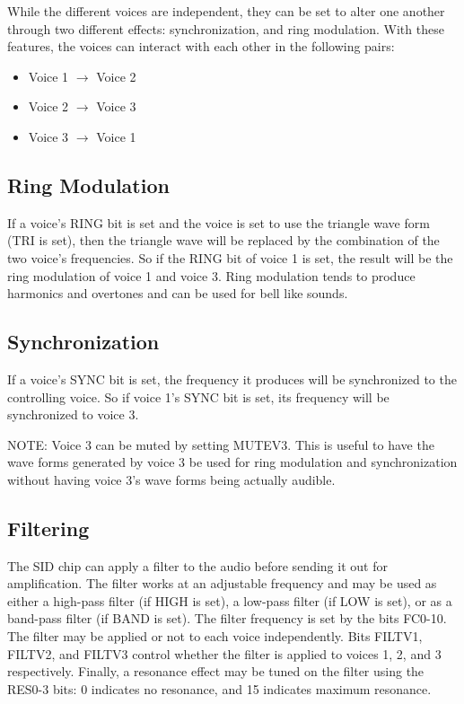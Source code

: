 While the different voices are independent, they can be set to alter one another through two different effects: synchronization, and ring modulation. With these features, the voices can interact with each other in the following pairs:

\begin{itemize}
\item Voice 1 $\rightarrow$ Voice 2
\item Voice 2 $\rightarrow$ Voice 3
\item Voice 3 $\rightarrow$ Voice 1
\end{itemize}

\subsection*{Ring Modulation}

If a voice's RING bit is set and the voice is set to use the triangle wave form (TRI is set), then the triangle wave will be replaced by the combination of the two voice's frequencies. So if the RING bit of voice 1 is set, the result will be the ring modulation of voice 1 and voice 3. Ring modulation tends to produce harmonics and overtones and can be used for bell like sounds.

\subsection*{Synchronization}

If a voice's SYNC bit is set, the frequency it produces will be synchronized to the controlling voice. So if voice 1's SYNC bit is set, its frequency will be synchronized to voice 3.

NOTE: Voice 3 can be muted by setting MUTEV3. This is useful to have the wave forms generated by voice 3 be used for ring modulation and synchronization without having voice 3's wave forms being actually audible.

\subsection*{Filtering}

The SID chip can apply a filter to the audio before sending it out for amplification. The filter works at an adjustable frequency and may be used as either a high-pass filter (if HIGH is set), a low-pass filter (if LOW is set), or as a band-pass filter (if BAND is set). The filter frequency is set by the bits FC0-10. The filter may be applied or not to each voice independently. Bits FILTV1, FILTV2, and FILTV3 control whether the filter is applied to voices 1, 2, and 3 respectively. Finally, a resonance effect may be tuned on the filter using the RES0-3 bits: 0 indicates no resonance, and 15 indicates maximum resonance.